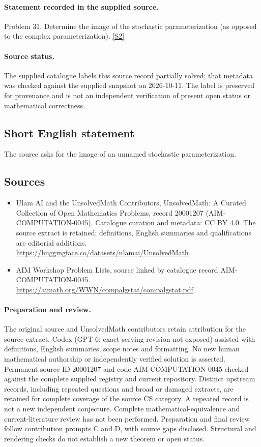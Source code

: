 \documentclass[11pt]{article}
\begin{document}
\paragraph{Statement recorded in the supplied source.}
Problem 31. Determine the image of the stochastic parameterization (as opposed to the complex parameterization). \href{https://aimath.org/WWN/compalgstat/compalgstat.pdf}{[S2]}
\paragraph{Source status.}
The supplied catalogue labels this source record partially solved; that metadata was checked against the supplied snapshot on 2026-10-11. The label is preserved for provenance and is not an independent verification of present open status or mathematical correctness.
\subsection{Short English statement}
The source asks for the image of an unnamed stochastic parameterization.
\subsection{Sources}
\begin{itemize}
\item[S1] Ulam AI and the UnsolvedMath Contributors, UnsolvedMath: A Curated Collection of Open Mathematics Problems, record 20001207 (AIM-COMPUTATION-0045). Catalogue curation and metadata: CC BY 4.0. The source extract is retained; definitions, English summaries and qualifications are editorial additions.
\url{https://huggingface.co/datasets/ulamai/UnsolvedMath}.
\item[S2] AIM Workshop Problem Lists, source linked by catalogue record AIM-COMPUTATION-0045.
\url{https://aimath.org/WWN/compalgstat/compalgstat.pdf}.
\end{itemize}
\paragraph{Preparation and review.}
The original source and UnsolvedMath contributors retain attribution for the source extract. Codex (GPT-6; exact serving revision not exposed) assisted with definitions, English summaries, scope notes and formatting. No new human mathematical authorship or independently verified solution is asserted. Permanent source ID 20001207 and code AIM-COMPUTATION-0045 checked against the complete supplied registry and current repository. Distinct upstream records, including repeated questions and broad or damaged extracts, are retained for complete coverage of the source CS category. A repeated record is not a new independent conjecture. Complete mathematical-equivalence and current-literature review has not been performed. Preparation and final review follow contribution prompts C and D, with source gaps disclosed. Structural and rendering checks do not establish a new theorem or open status.
\label{end:20001207}
\end{document}
